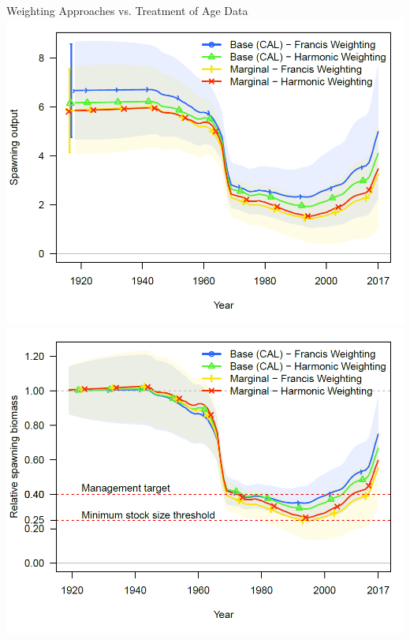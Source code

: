 \documentclass[pdf]{beamer}\usepackage[]{graphicx}\usepackage[]{color}
\begin{document}
\begin{frame}{Weighting Approaches vs. Treatment of Age Data}
  \includegraphics[scale = 0.24]{figures/CAL_Marg_weighting_ssb.png}
  \includegraphics[scale = 0.24]{figures/CAL_Marg_weighting_depl.png}
\end{frame}
\end{document}
